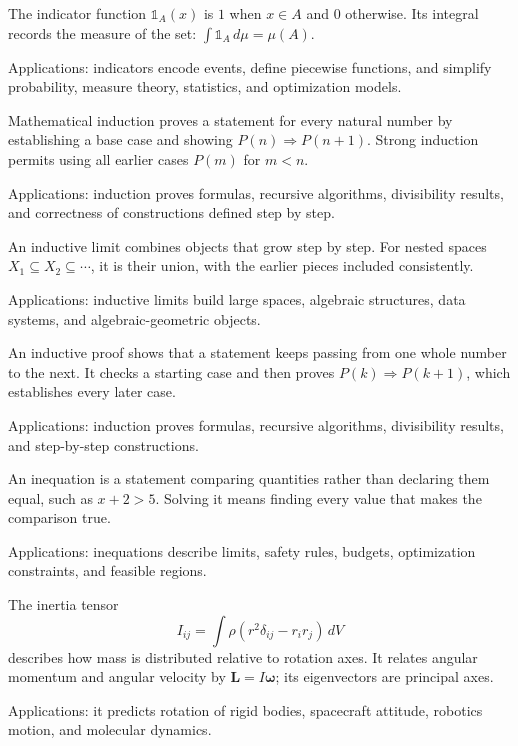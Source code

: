 The indicator function $\mathbb 1_A(x)$ is $1$ when $x\in A$ and $0$ otherwise. Its integral records the measure of the set: $\int\mathbb1_A\,d\mu=\mu(A)$. \par\noindent Applications: indicators encode events, define piecewise functions, and simplify probability, measure theory, statistics, and optimization models.

Mathematical induction proves a statement for every natural number by establishing a base case and showing $P(n)\Rightarrow P(n+1)$. Strong induction permits using all earlier cases $P(m)$ for $m<n$. \par\noindent Applications: induction proves formulas, recursive algorithms, divisibility results, and correctness of constructions defined step by step.

An inductive limit combines objects that grow step by step. For nested spaces $X_1\subseteq X_2\subseteq\cdots$, it is their union, with the earlier pieces included consistently. \par\noindent Applications: inductive limits build large spaces, algebraic structures, data systems, and algebraic-geometric objects.

An inductive proof shows that a statement keeps passing from one whole number to the next. It checks a starting case and then proves $P(k)\Rightarrow P(k+1)$, which establishes every later case. \par\noindent Applications: induction proves formulas, recursive algorithms, divisibility results, and step-by-step constructions.

An inequation is a statement comparing quantities rather than declaring them equal, such as $x+2>5$. Solving it means finding every value that makes the comparison true. \par\noindent Applications: inequations describe limits, safety rules, budgets, optimization constraints, and feasible regions.

The inertia tensor
\[
I_{ij}=\int\rho(r^2\delta_{ij}-r_ir_j)\,dV
\]
describes how mass is distributed relative to rotation axes. It relates angular momentum and angular velocity by $\mathbf L=I\boldsymbol\omega$; its eigenvectors are principal axes. \par\noindent Applications: it predicts rotation of rigid bodies, spacecraft attitude, robotics motion, and molecular dynamics.


